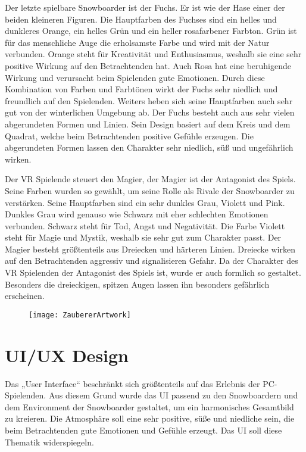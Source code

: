 Der letzte spielbare Snowboarder ist der Fuchs. Er ist wie der Hase einer der beiden kleineren Figuren. Die Hauptfarben des Fuchses sind ein helles und dunkleres Orange, ein helles Grün und ein heller rosafarbener Farbton. Grün ist für das menschliche Auge die erholsamste Farbe und wird mit der Natur verbunden. Orange steht für Kreativität und Enthusiasmus, weshalb sie eine sehr positive Wirkung auf den Betrachtenden hat. Auch Rosa hat eine beruhigende Wirkung und verursacht beim Spielenden gute Emotionen. Durch diese Kombination von Farben und Farbtönen wirkt der Fuchs sehr niedlich und freundlich auf den Spielenden. Weiters heben sich seine Hauptfarben auch sehr gut von der winterlichen Umgebung ab.
Der Fuchs besteht auch aus sehr vielen abgerundeten Formen und Linien. Sein Design basiert auf dem Kreis und dem Quadrat, welche beim Betrachtenden positive Gefühle erzeugen. Die abgerundeten Formen lassen den Charakter sehr niedlich, süß und ungefährlich wirken. 



Der VR Spielende steuert den Magier, der Magier ist der Antagonist des Spiels. Seine Farben wurden so gewählt, um seine Rolle als Rivale der Snowboarder zu verstärken. Seine Hauptfarben sind ein sehr dunkles Grau, Violett und Pink. Dunkles Grau wird genauso wie Schwarz mit eher schlechten Emotionen verbunden. Schwarz steht für Tod, Angst und Negativität. Die Farbe Violett steht für Magie und Mystik, weshalb sie sehr gut zum Charakter passt.
Der Magier besteht größtenteils aus Dreiecken und härteren Linien. Dreiecke wirken auf den Betrachtenden aggressiv und signalisieren Gefahr. Da der Charakter des VR Spielenden der Antagonist des Spiels ist, wurde er auch formlich so gestaltet. Besonders die dreieckigen, spitzen Augen lassen ihn besonders gefährlich erscheinen.

\begin{figure}[H]
	\centering
	\texttt{[image: ZaubererArtwork]}
\end{figure}


\section{UI/UX Design}
Das „User Interface“ beschränkt sich größtenteils auf das Erlebnis der PC-Spielenden. Aus diesem Grund wurde das UI passend zu den Snowboardern und dem Environment der Snowboarder gestaltet, um ein harmonisches Gesamtbild zu kreieren. Die Atmosphäre soll eine sehr positive, süße und niedliche sein, die beim Betrachtenden gute Emotionen und Gefühle erzeugt. Das UI soll diese Thematik widerspiegeln.

